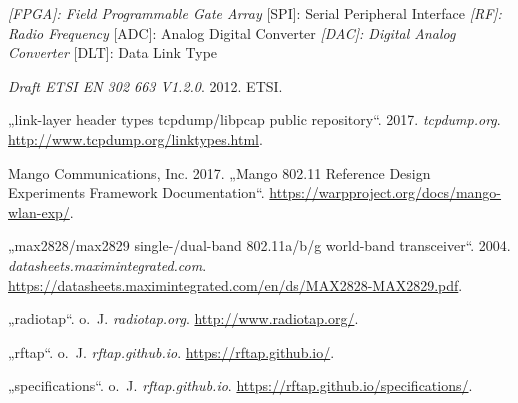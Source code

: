 \documentclass[ngerman,]{scrartcl}
\begin{document}
\emph{{[}FPGA{]}: Field Programmable Gate Array }{[}SPI{]}: Serial
Peripheral Interface \emph{{[}RF{]}: Radio Frequency }{[}ADC{]}: Analog
Digital Converter \emph{{[}DAC{]}: Digital Analog Converter }{[}DLT{]}:
Data Link Type

\hypertarget{refs}{}
\hypertarget{ref-etsi}{}
\emph{Draft ETSI EN 302 663 V1.2.0}. 2012. ETSI.

\hypertarget{ref-tcpdump}{}
„link-layer header types \textbar{} tcpdump/libpcap public repository``.
2017. \emph{tcpdump.org}. \url{http://www.tcpdump.org/linktypes.html}.

\hypertarget{ref-warp-exp}{}
Mango Communications, Inc. 2017. „Mango 802.11 Reference Design
Experiments Framework Documentation``.
\url{https://warpproject.org/docs/mango-wlan-exp/}.

\hypertarget{ref-max2829}{}
„max2828/max2829 single-/dual-band 802.11a/b/g world-band transceiver``.
2004. \emph{datasheets.maximintegrated.com}.
\url{https://datasheets.maximintegrated.com/en/ds/MAX2828-MAX2829.pdf}.

\hypertarget{ref-radiotap}{}
„radiotap``. o.~J. \emph{radiotap.org}. \url{http://www.radiotap.org/}.

\hypertarget{ref-rftap}{}
„rftap``. o.~J. \emph{rftap.github.io}. \url{https://rftap.github.io/}.

\hypertarget{ref-rftap-specifications}{}
„specifications``. o.~J. \emph{rftap.github.io}.
\url{https://rftap.github.io/specifications/}.
\end{document}
